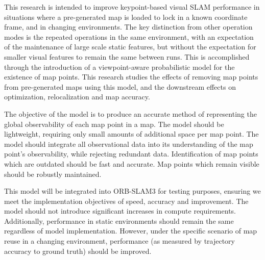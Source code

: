 This research is intended to improve keypoint-based visual SLAM performance in situations where a pre-generated map is loaded to lock in a known coordinate frame, and in changing environments. The key distinction from other operation modes is the repeated operations in the same environment, with an expectation of the maintenance of large scale static features, but without the expectation for smaller visual features to remain the same between runs. This is accomplished through the introduction of a viewpoint-aware probabilistic model for the existence of map points. This research studies the effects of removing map points from pre-generated maps using this model, and the downstream effects on optimization, relocalization and map accuracy.


The objective of the model is to produce an accurate method of representing the global observability of each map point in a map. The model should be lightweight, requiring only small amounts of additional space per map point. The model should integrate all observational data into its understanding of the map point's observability, while rejecting redundant data. Identification of map points which are outdated should be fast and accurate. Map points which remain visible should be robustly maintained.


This model will be integrated into ORB-SLAM3 for testing purposes, ensuring we meet the implementation objectives of speed, accuracy and improvement. The model should not introduce significant increases in compute requirements. Additionally, performance in static environments should remain the same regardless of model implementation. However, under the specific scenario of map reuse in a changing environment, performance (as measured by trajectory accuracy to ground truth) should be improved.